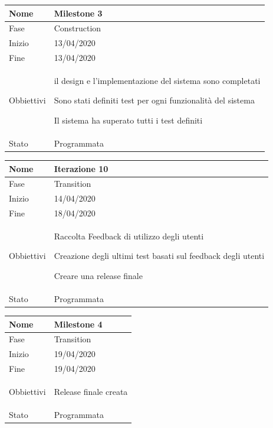 \begin{center}
\begin{tabular}{ |p{2cm}|p{10cm}|  }
\hline
Nome & Milestone 3\\\hline
Fase & Construction \\\hline
Inizio & 13/04/2020 \\\hline
Fine &  13/04/2020 \\\hline
Obbiettivi & 
	\begin{compactitem}
		\item il design e l'implementazione del sistema sono completati
		\item Sono stati definiti test per ogni funzionalità del sistema
		\item Il sistema ha superato tutti i test definiti
	\end{compactitem}\\\hline
Stato &  Programmata \\\hline
\end{tabular}
\label{table:milestone4}\newline

\begin{tabular}{ |p{2cm}|p{10cm}|  }
\hline
Nome & Iterazione 10 \\\hline
Fase & Transition \\\hline
Inizio & 14/04/2020 \\\hline
Fine &  18/04/2020  \\\hline
Obbiettivi & 
	\begin{compactitem}
		\item Raccolta Feedback di utilizzo degli utenti
		\item Creazione degli ultimi test basati sul feedback degli utenti
		\item Creare una release finale
	\end{compactitem}\\\hline
Stato &  Programmata \\\hline
\end{tabular}
\label{table:10}\newline

\begin{tabular}{ |p{2cm}|p{10cm}|  }
\hline
Nome & Milestone 4\\\hline
Fase & Transition \\\hline
Inizio & 19/04/2020 \\\hline
Fine &  19/04/2020 \\\hline
Obbiettivi & 
	\begin{compactitem}
		\item Release finale creata
	\end{compactitem}\\\hline
Stato &  Programmata \\\hline
\end{tabular}
\label{table:milestone5}\newline


\end{center}

